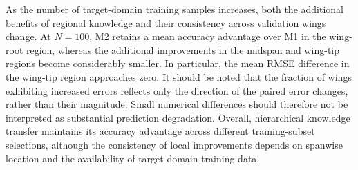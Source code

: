 As the number of target-domain training samples increases, both the additional benefits of regional knowledge and their consistency across validation wings change. At $N=100$, M2 retains a mean accuracy advantage over M1 in the wing-root region, whereas the additional improvements in the midspan and wing-tip regions become considerably smaller. In particular, the mean RMSE difference in the wing-tip region approaches zero. It should be noted that the fraction of wings exhibiting increased errors reflects only the direction of the paired error changes, rather than their magnitude. Small numerical differences should therefore not be interpreted as substantial prediction degradation. Overall, hierarchical knowledge transfer maintains its accuracy advantage across different training-subset selections, although the consistency of local improvements depends on spanwise location and the availability of target-domain training data.
